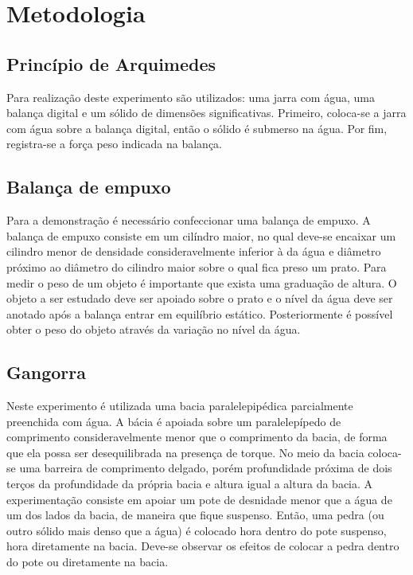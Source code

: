 \section{Metodologia}

\subsection{Princípio de Arquimedes}
Para realização deste experimento são utilizados: uma jarra com água, uma
balança digital e um sólido de dimensões significativas. Primeiro, coloca-se a
jarra com água sobre a balança digital, então o sólido é submerso na água. Por
fim, registra-se a força peso indicada na balança.

\subsection{Balança de empuxo}
Para a demonstração é necessário confeccionar uma balança de empuxo. A balança
de empuxo consiste em um cilíndro maior, no qual deve-se encaixar um cilindro
menor de densidade consideravelmente inferior à da água e diâmetro próximo ao
diâmetro do cilindro maior sobre o qual fica preso um prato. Para medir o peso
de um objeto é importante que exista uma graduação de altura. O objeto a ser
estudado deve ser apoiado sobre o prato e o nível da água deve ser anotado após
a balança entrar em equilíbrio estático. Posteriormente é possível obter o peso
do objeto através da variação no nível da água.

\subsection{Gangorra}
Neste experimento é utilizada uma bacia paralelepipédica parcialmente preenchida
com água. A bácia é apoiada sobre um paralelepípedo de comprimento
consideravelmente menor que o comprimento da bacia, de forma que ela possa ser
desequilibrada na presença de torque. No meio da bacia coloca-se uma barreira de
comprimento delgado, porém profundidade próxima de dois terços da profundidade
da própria bacia e altura igual a altura da bacia. A experimentação consiste em
apoiar um pote de desnidade menor que a água de um dos lados da bacia, de
maneira que fique suspenso. Então, uma pedra (ou outro sólido mais denso que a
água) é colocado hora dentro do pote suspenso, hora diretamente na bacia.
Deve-se observar os efeitos de colocar a pedra dentro do pote ou diretamente na
bacia. 

